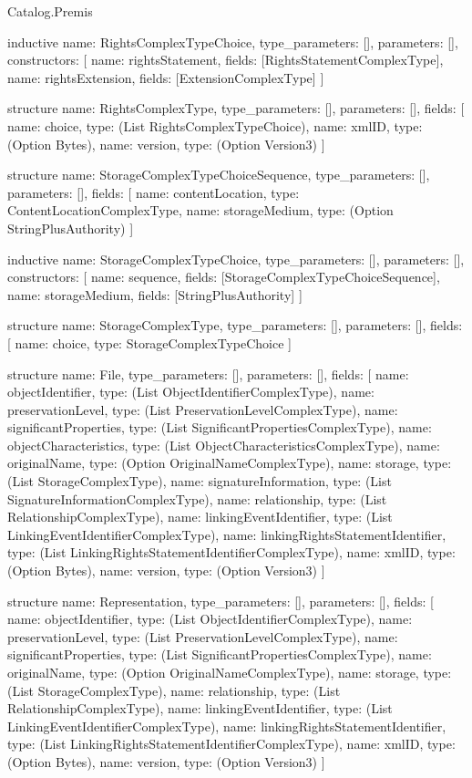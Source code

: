 \begin{lexlean}{Catalog.Premis}
\begin{semanticmodule}
inductive{
  name: RightsComplexTypeChoice,
  type_parameters: [],
  parameters: [],
  constructors: [
    {name: rightsStatement, fields: [RightsStatementComplexType]},
    {name: rightsExtension, fields: [ExtensionComplexType]}
  ]
}

structure{
  name: RightsComplexType,
  type_parameters: [],
  parameters: [],
  fields: [
    {name: choice, type: (List RightsComplexTypeChoice)},
    {name: xmlID, type: (Option Bytes)},
    {name: version, type: (Option Version3)}
  ]
}

structure{
  name: StorageComplexTypeChoiceSequence,
  type_parameters: [],
  parameters: [],
  fields: [
    {name: contentLocation, type: ContentLocationComplexType},
    {name: storageMedium, type: (Option StringPlusAuthority)}
  ]
}

inductive{
  name: StorageComplexTypeChoice,
  type_parameters: [],
  parameters: [],
  constructors: [
    {name: sequence, fields: [StorageComplexTypeChoiceSequence]},
    {name: storageMedium, fields: [StringPlusAuthority]}
  ]
}

structure{
  name: StorageComplexType,
  type_parameters: [],
  parameters: [],
  fields: [
    {name: choice, type: StorageComplexTypeChoice}
  ]
}

structure{
  name: File,
  type_parameters: [],
  parameters: [],
  fields: [
    {name: objectIdentifier, type: (List ObjectIdentifierComplexType)},
    {name: preservationLevel, type: (List PreservationLevelComplexType)},
    {name: significantProperties, type: (List SignificantPropertiesComplexType)},
    {name: objectCharacteristics, type: (List ObjectCharacteristicsComplexType)},
    {name: originalName, type: (Option OriginalNameComplexType)},
    {name: storage, type: (List StorageComplexType)},
    {name: signatureInformation, type: (List SignatureInformationComplexType)},
    {name: relationship, type: (List RelationshipComplexType)},
    {name: linkingEventIdentifier, type: (List LinkingEventIdentifierComplexType)},
    {name: linkingRightsStatementIdentifier, type: (List LinkingRightsStatementIdentifierComplexType)},
    {name: xmlID, type: (Option Bytes)},
    {name: version, type: (Option Version3)}
  ]
}

structure{
  name: Representation,
  type_parameters: [],
  parameters: [],
  fields: [
    {name: objectIdentifier, type: (List ObjectIdentifierComplexType)},
    {name: preservationLevel, type: (List PreservationLevelComplexType)},
    {name: significantProperties, type: (List SignificantPropertiesComplexType)},
    {name: originalName, type: (Option OriginalNameComplexType)},
    {name: storage, type: (List StorageComplexType)},
    {name: relationship, type: (List RelationshipComplexType)},
    {name: linkingEventIdentifier, type: (List LinkingEventIdentifierComplexType)},
    {name: linkingRightsStatementIdentifier, type: (List LinkingRightsStatementIdentifierComplexType)},
    {name: xmlID, type: (Option Bytes)},
    {name: version, type: (Option Version3)}
  ]
}


\end{semanticmodule}
\end{lexlean}
